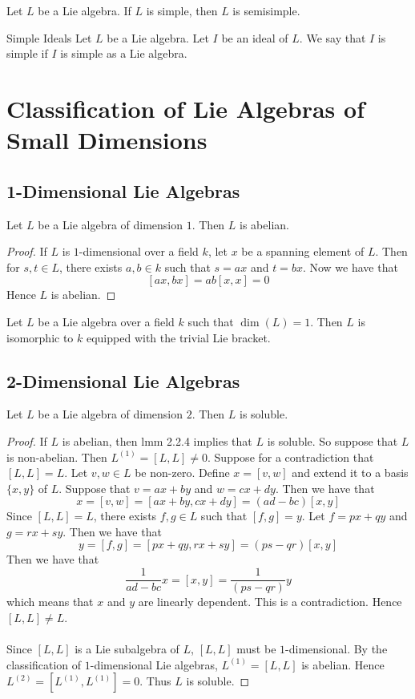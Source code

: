 \documentclass[a4paper]{article}
\begin{document}
\begin{lmm}{}{} Let $L$ be a Lie algebra. If $L$ is simple, then $L$ is semisimple. 
\end{lmm}

\begin{defn}{Simple Ideals}{} Let $L$ be a Lie algebra. Let $I$ be an ideal of $L$. We say that $I$ is simple if $I$ is simple as a Lie algebra. 
\end{defn}

\pagebreak
\section{Classification of Lie Algebras of Small Dimensions}
\subsection{1-Dimensional Lie Algebras}
\begin{prp}{}{} Let $L$ be a Lie algebra of dimension $1$. Then $L$ is abelian. \tcbline
\begin{proof}
If $L$ is $1$-dimensional over a field $k$, let $x$ be a spanning element of $L$. Then for $s,t\in L$, there exists $a,b\in k$ such that $s=ax$ and $t=bx$. Now we have that $$[ax,bx]=ab[x,x]=0$$ Hence $L$ is abelian. 
\end{proof}
\end{prp}

\begin{prp}{}{} Let $L$ be a Lie algebra over a field $k$ such that $\dim(L)=1$. Then $L$ is isomorphic to $k$ equipped with the trivial Lie bracket. 
\end{prp}

\subsection{2-Dimensional Lie Algebras}
\begin{prp}{}{} Let $L$ be a Lie algebra of dimension $2$. Then $L$ is soluble. \tcbline
\begin{proof}
If $L$ is abelian, then lmm 2.2.4 implies that $L$ is soluble. So suppose that $L$ is non-abelian. Then $L^{(1)}=[L,L]\neq 0$. Suppose for a contradiction that $[L,L]=L$. Let $v,w\in L$ be non-zero. Define $x=[v,w]$ and extend it to a basis $\{x,y\}$ of $L$. Suppose that $v=ax+by$ and $w=cx+dy$. Then we have that $$x=[v,w]=[ax+by,cx+dy]=(ad-bc)[x,y]$$ Since $[L,L]=L$, there exists $f,g\in L$ such that $[f,g]=y$. Let $f=px+qy$ and $g=rx+sy$. Then we have that $$y=[f,g]=[px+qy,rx+sy]=(ps-qr)[x,y]$$ Then we have that $$\frac{1}{ad-bc}x=[x,y]=\frac{1}{(ps-qr)}y$$ which means that $x$ and $y$ are linearly dependent. This is a contradiction. Hence $[L,L]\neq L$. \\~\\

Since $[L,L]$ is a Lie subalgebra of $L$, $[L,L]$ must be $1$-dimensional. By the classification of $1$-dimensional Lie algebras, $L^{(1)}=[L,L]$ is abelian. Hence $L^{(2)}=[L^{(1)},L^{(1)}]=0$. Thus $L$ is soluble. 
\end{proof}
\end{prp}
\end{document}
